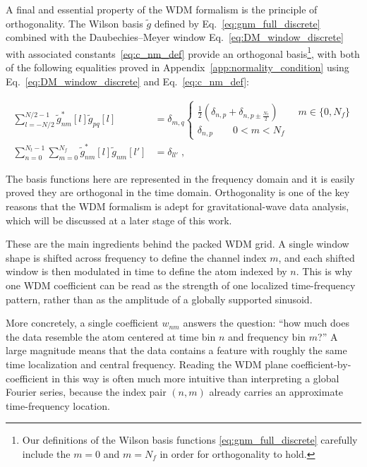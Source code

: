 A final and essential property of the WDM formalism is the principle of orthogonality. The Wilson basis $\tilde{g}$ defined by Eq.~\eqref{eq:gnm_full_discrete} combined with the Daubechies--Meyer window Eq.~\eqref{eq:DM_window_discrete} with associated constants~\eqref{eq:c_nm_def} provide an orthogonal basis\footnote{Our definitions of the Wilson basis functions \eqref{eq:gnm_full_discrete} carefully include the $m=0$ and $m = N_f$ in order for orthogonality to hold.}, with both of the following equalities proved in Appendix~\ref{app:normality_condition} using Eq.~\eqref{eq:DM_window_discrete} and Eq.~\eqref{eq:c_nm_def}:%
\begin{widetext}
\begin{align}\label{eq:orthonormality}
\sum_{l=-N/2}^{N/2-1}\tilde{g}^*_{nm}[l]\tilde{g}_{pq}[l]&=\delta_{m,q}\begin{cases}
    \frac{1}{2}\left(\delta_{n,p}+\delta_{n,p\pm \frac{N_t}{2}}\right) \qquad m\in\{0,N_f\}\\
    \delta_{n,p} \qquad 0<m<N_f
\end{cases}\nonumber\\
\sum_{n=0}^{N_t-1}\sum_{m=0}^{N_f}\tilde{g}^*_{nm}[l]\tilde{g}_{nm}[l']&=\delta_{ll'}\;,
\end{align}
\end{widetext}

The basis functions here are represented in the frequency domain and it is easily proved they are orthogonal in the time domain.
Orthogonality is one of the key reasons that the WDM formalism is adept for gravitational-wave data analysis, which will be discussed at a later stage of this work.



These are the main ingredients behind the packed WDM grid. A single window shape is shifted across
frequency to define the channel index $m$, and each shifted window is then modulated in time to define the atom indexed by $n$. This is why one WDM coefficient can be read as the strength of one localized time-frequency pattern, rather than as the amplitude of a globally supported sinusoid. 

More concretely, a single coefficient $w_{nm}$ answers the question:
``how much does the data resemble the atom centered at time bin $n$
and frequency bin $m$?'' A large magnitude means that the data
contains a feature with roughly the same time localization and central
frequency. 
Reading the WDM plane coefficient-by-coefficient in this way is often much more
intuitive than interpreting a global Fourier series, because the
index pair $(n,m)$ already carries an approximate time-frequency location.

